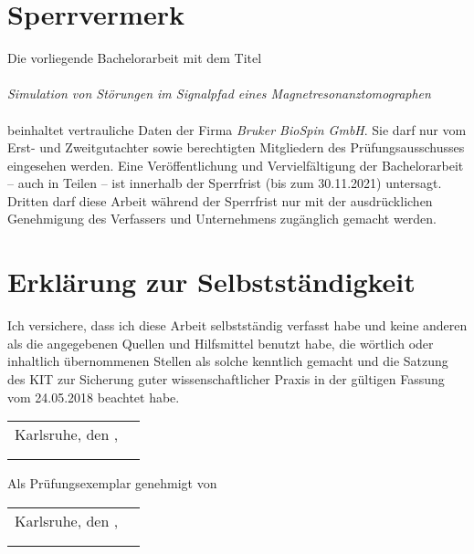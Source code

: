 \chapter*{Sperrvermerk}
\thispagestyle{empty}
Die vorliegende Bachelorarbeit mit dem Titel
\\\\
\textit{Simulation von Störungen im Signalpfad eines Magnetresonanztomographen}
\\\\ 
beinhaltet vertrauliche Daten der Firma \textit{Bruker BioSpin GmbH}. Sie darf nur vom Erst- und Zweitgutachter sowie berechtigten Mitgliedern des Prüfungsausschusses eingesehen werden. Eine Veröffentlichung und Vervielfältigung der Bachelorarbeit – auch in Teilen – ist innerhalb der Sperrfrist (bis zum 30.11.2021) untersagt. Dritten darf diese Arbeit während der Sperrfrist nur mit der ausdrücklichen Genehmigung des Verfassers und Unternehmens zugänglich gemacht werden.


\chapter*{Erklärung zur Selbstständigkeit}
\thispagestyle{empty}
Ich versichere, dass ich diese Arbeit selbstständig verfasst habe und keine %
anderen als die angegebenen Quellen und Hilfsmittel benutzt habe, die %
wörtlich oder inhaltlich übernommenen Stellen als solche kenntlich gemacht und %
die Satzung des KIT zur Sicherung guter wissenschaftlicher Praxis in der %
gültigen Fassung vom 24.05.2018 beachtet habe.\\

\vspace{1cm}

\renewcommand{\arraystretch}{0} %

\begin{flushright}
	\begin{tabular}{rr}
		Karlsruhe, den \thesistimehandin, & \hspace*{5cm}\\[0mm]
		\cline{2-2}\\[2mm]    %
		& \thesisauthor       %
	\end{tabular}
\end{flushright}

\vfill

\begin{flushright}
	Als Prüfungsexemplar genehmigt von\\
	\vspace{1cm}
	\begin{tabular}{rr}
		Karlsruhe, den \thesistimehandin, & \hspace*{5cm}\\[0mm]
		\cline{2-2}\\[2mm]    %
		& \thesisreviewerone  %
	\end{tabular}
\end{flushright}

\renewcommand{\arraystretch}{1}

\cleardoublepage
